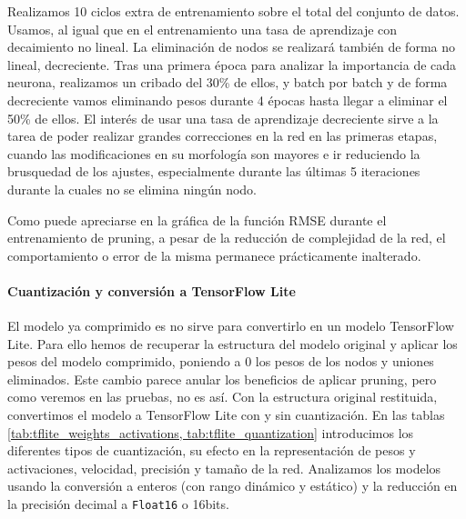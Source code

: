 Realizamos 10 ciclos extra de entrenamiento sobre el total del conjunto de datos. Usamos, al igual que en el entrenamiento una tasa de aprendizaje con decaimiento no lineal. La eliminación de nodos se realizará también de forma no lineal, decreciente. Tras una primera época para analizar la importancia de cada neurona, realizamos un cribado del 30\% de ellos, y batch por batch y de forma decreciente vamos eliminando pesos durante 4 épocas hasta llegar a eliminar el 50\% de ellos. El interés de usar una tasa de aprendizaje decreciente sirve a la tarea de poder realizar grandes correcciones en la red en las primeras etapas, cuando las modificaciones en su morfología son mayores e ir reduciendo la brusquedad de los ajustes, especialmente durante las últimas 5 iteraciones durante la cuales no se elimina ningún nodo.

Como puede apreciarse en la gráfica de la función RMSE durante el entrenamiento de pruning, a pesar de la reducción de complejidad de la red, el comportamiento o error de la misma permanece prácticamente inalterado.


\paragraph{Cuantización y conversión a TensorFlow Lite}
El modelo ya comprimido es no sirve para convertirlo en un modelo TensorFlow Lite. Para ello hemos de recuperar la estructura del modelo original y aplicar los pesos del modelo comprimido, poniendo a 0 los pesos de los nodos y uniones eliminados. Este cambio parece anular los beneficios de aplicar pruning, pero como veremos en las pruebas, no es así. 
Con la estructura original restituida, convertimos el modelo a TensorFlow Lite con y sin cuantización. En las tablas \ref{tab:tflite_weights_activations, tab:tflite_quantization}  introducimos los diferentes tipos de cuantización, su efecto en la representación de pesos y activaciones, velocidad, precisión y tamaño de la red. Analizamos los modelos usando la conversión a enteros (con rango dinámico y estático) y la reducción en la precisión decimal a \texttt{Float16} o 16bits.


